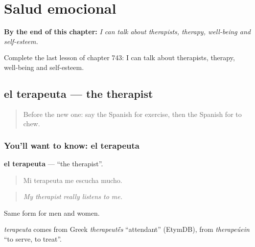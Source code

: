
\chapter{Salud emocional}
\label{ch:es-salud-emocional}

\begin{chapteropening}
\textbf{By the end of this chapter:} \emph{I can talk about therapists, therapy, well-being and self-esteem.}

Complete the last lesson of chapter 743: I can talk about therapists, therapy, well-being and self-esteem.
\end{chapteropening}

\section[el terapeuta]{el terapeuta — the therapist}

\label{lesson:ES-C743-terapeuta}



\begin{quote}
Before the new one: say the Spanish for exercise, then the Spanish for to chew.
\end{quote}

\subsection*{You'll want to know: el terapeuta}
\textbf{el terapeuta} — \textquotedblleft{}the therapist\textquotedblright{}.

\begin{quote}
Mi terapeuta me escucha mucho.
\end{quote}

\begin{quote}
\emph{My therapist really listens to me.}
\end{quote}

Same form for men and women.

\begin{cousinweb}
\emph{terapeuta} comes from Greek \emph{therapeut\'{\={e}}s} \textquotedblleft{}attendant\textquotedblright{} (EtymDB), from \emph{therapeúein} \textquotedblleft{}to serve, to treat\textquotedblright{}.
\end{cousinweb}

